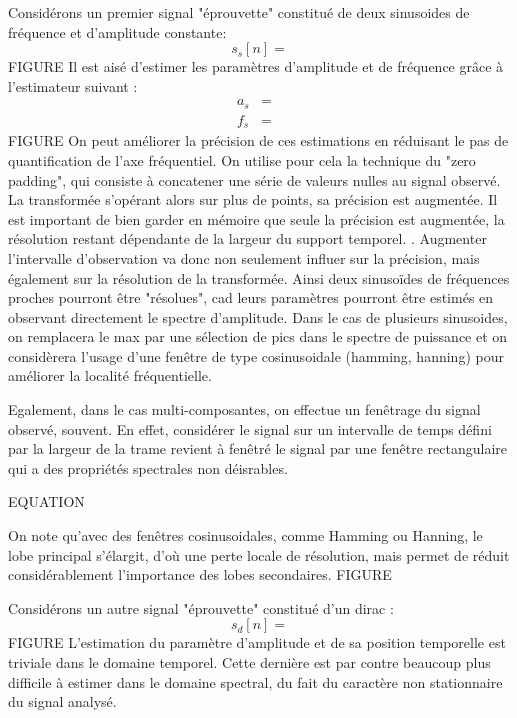 Considérons un premier signal "éprouvette" constitué de deux sinusoides de fréquence et d'amplitude constante:
\begin{equation}
  s_s[n] =
\end{equation} FIGURE
Il est aisé d'estimer les paramètres d'amplitude et de fréquence grâce à l'estimateur suivant :
\begin{eqnarray}
  a_s &=& \\
  f_s &=&
\end{eqnarray} FIGURE
On peut améliorer la précision de ces estimations en réduisant le pas de quantification de l'axe fréquentiel. On utilise pour cela la technique du "zero padding", qui consiste à concatener une série de valeurs nulles au signal observé. La transformée s'opérant alors sur plus de points, sa précision est augmentée. Il est important de bien garder en mémoire que seule la précision est augmentée, la résolution restant dépendante de la largeur du support temporel. . Augmenter l'intervalle d'observation va donc non seulement influer sur la précision, mais également sur la résolution de la transformée. Ainsi deux sinusoïdes de fréquences proches pourront être "résolues", cad leurs paramètres pourront être estimés en observant directement le spectre d'amplitude. Dans le cas de plusieurs sinusoides, on remplacera le max par une sélection de pics dans le spectre de puissance et on considèrera l'usage d'une fenêtre de type cosinusoidale (hamming, hanning) pour améliorer la localité fréquentielle.

Egalement, dans le cas multi-composantes, on effectue un fenêtrage du signal observé, souvent. En effet, considérer le signal sur un intervalle de temps défini par la largeur de la trame revient à fenêtré le signal par une fenêtre rectangulaire qui a des propriétés spectrales non déisrables.

EQUATION

On note qu'avec des fenêtres cosinusoidales, comme Hamming ou Hanning, le lobe principal s'élargit, d'où une perte locale de résolution, mais permet de réduit considérablement l'importance des lobes secondaires. FIGURE

Considérons un autre signal "éprouvette" constitué d'un dirac :
\begin{equation}
  s_d[n] =
\end{equation} FIGURE
L'estimation du paramètre d'amplitude et de sa position temporelle est triviale dans le domaine temporel. Cette dernière est par contre beaucoup plus difficile à estimer dans le domaine spectral, du fait du caractère non stationnaire du signal analysé.

